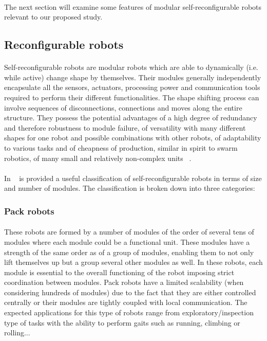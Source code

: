 \paragraph{}The next section will examine some features of modular self-reconfigurable robots relevant to our proposed study.

\subsection{Reconfigurable robots}
\paragraph{}Self-reconfigurable robots are modular robots which are able to dynamically (i.e. while active) change shape by themselves. Their modules generally independently encapsulate all the sensors, actuators, processing power and communication tools required to perform their different functionalities. The shape shifting process can involve sequences of disconnections, connections and moves along the entire structure. They possess the potential advantages of a high degree of redundancy and therefore robustness to module failure, of versatility with many different shapes for one robot and possible combinations with other robots, of adaptability to various tasks and of cheapness of production, similar in spirit to swarm robotics, of many small and relatively non-complex  units ~\cite{StoyBook}.
\paragraph{}In ~\cite{StoyBook} is provided a useful classification of self-reconfigurable robots in terms of size and number of modules. The classification is broken down into three categories:
\subsubsection{Pack robots}
\paragraph{}These robots are formed by a number of modules of the order of several tens of modules where each module could be a functional unit. These modules have a strength of the same order as of a group of modules, enabling them to not only lift themselves up but a group several other modules as well. In these robots, each module is essential to the overall functioning of the robot imposing strict coordination between modules. Pack robots have a limited scalability (when considering hundreds of modules) due to the fact that they are either controlled centrally or their modules are tightly coupled with local communication. The expected applications for this type of robots range from exploratory/inspection type of tasks with the ability to perform gaits such as running, climbing or rolling...
